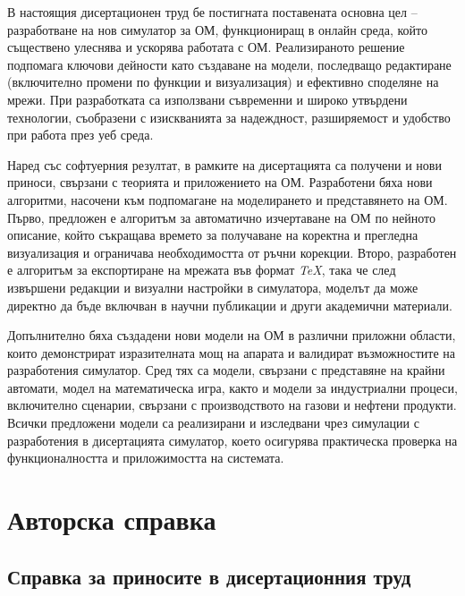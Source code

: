 \hspace*{2.5em}В настоящия дисертационен труд бе постигната поставената основна цел – разработване на нов симулатор за ОМ, функциониращ в онлайн среда, който съществено улеснява и ускорява работата с ОМ. Реализираното решение подпомага ключови дейности като създаване на модели, последващо редактиране (включително промени по функции и визуализация) и ефективно споделяне на мрежи. При разработката са използвани съвременни и широко утвърдени технологии, съобразени с изискванията за надеждност, разширяемост и удобство при работа през уеб среда.

Наред със софтуерния резултат, в рамките на дисертацията са получени и нови приноси, свързани с теорията и приложението на ОМ. Разработени бяха нови алгоритми, насочени към подпомагане на моделирането и представянето на ОМ. Първо, предложен е алгоритъм за автоматично изчертаване на ОМ по нейното описание, който съкращава времето за получаване на коректна и прегледна визуализация и ограничава необходимостта от ръчни корекции. Второ, разработен е алгоритъм за експортиране на мрежата във формат \textit{TeX}, така че след извършени редакции и визуални настройки в симулатора, моделът да може директно да бъде включван в научни публикации и други академични материали.

Допълнително бяха създадени нови модели на ОМ в различни приложни области, които демонстрират изразителната мощ на апарата и валидират възможностите на разработения симулатор. Сред тях са модели, свързани с представяне на крайни автомати, модел на математическа игра, както и модели за индустриални процеси, включително сценарии, свързани с производството на газови и нефтени продукти. Всички предложени модели са реализирани и изследвани чрез симулации с разработения в дисертацията симулатор, което осигурява практическа проверка на функционалността и приложимостта на системата.

\clearpage
{}
{}
\section*{Авторска справка}

\subsection*{Справка за приносите в дисертационния труд}

